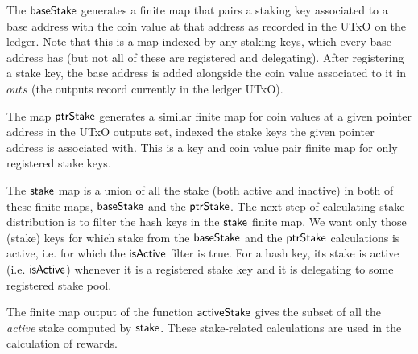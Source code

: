 The $\mathsf{baseStake}$ generates a finite map that pairs a staking key
associated to a base address with the coin value at that address as recorded
in the UTxO on the ledger. Note that this is a map indexed by any staking keys,
which every base address has (but not all of these are registered and delegating).
After registering a stake key, the base address is added alongside the
coin value associated to it in $outs$ (the outputs record currently in the
ledger UTxO).

The map
$\mathsf{ptrStake}$ generates a similar finite map for coin values at a given
pointer address in the UTxO outputs set, indexed the stake keys the given
pointer address is associated with.
This is a key and coin value pair finite map for only registered stake keys.

The $\mathsf{stake}$ map is a union of all the stake (both active and inactive) in
both of these finite
maps, $\mathsf{baseStake}$ and the $\mathsf{ptrStake}$.
The next step of calculating stake distribution is to filter the hash keys in
the $\mathsf{stake}$ finite map.
We want only those (stake) keys for which stake
from the $\mathsf{baseStake}$ and the $\mathsf{ptrStake}$ calculations is active, i.e.
for which the $\mathsf{isActive}$ filter is true.
For a hash key, its stake is active (i.e. $\mathsf{isActive}$) whenever it is a
registered stake key
and it is delegating to some registered stake pool.

The finite map output of the function $\mathsf{activeStake}$ gives the subset of
all the \textit{active} stake computed by $\mathsf{stake}$.
These stake-related calculations are used in the calculation of rewards.

